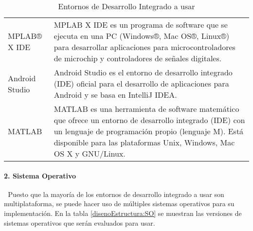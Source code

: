 \begin{table}[htbp]
	\begin{center}
		\begin{tabular}{|p{3cm}|p{10cm}|}
			\hline
			\thead{Nombre}&\thead{Descripción}\\
			\hline
			\hline
			MPLAB® X IDE &  MPLAB X IDE es un programa de software que se ejecuta en una PC (Windows®, Mac OS®, Linux®) para desarrollar aplicaciones para microcontroladores de microchip y controladores de señales digitales.\\
			\hline
			Android Studio & Android Studio es el entorno de desarrollo integrado (IDE) oficial para el desarrollo de aplicaciones para Android y se basa en IntelliJ IDEA.\\
			\hline
			MATLAB & MATLAB es una herramienta de software matemático que ofrece un entorno de desarrollo integrado (IDE) con un lenguaje de programación propio (lenguaje M). Está disponible para las plataformas Unix, Windows, Mac OS X y GNU/Linux.\\
			\hline
		\end{tabular}
		\caption{Entornos de Desarrollo Integrado a usar}
		\label{disenoEstructura:IDE}
	\end{center}
\end{table}



\paragraph{2. Sistema Operativo}  \textcolor{White}{.} \newline
Puesto que la mayoría de los entornos de desarrollo integrado a usar son multiplataforma, se puede hacer uso de múltiples sistemas operativos para su implementación. En la tabla \ref{disenoEstructura:SO} se muestran las versiones de sistemas operativos que serán evaluados para usar.\\

